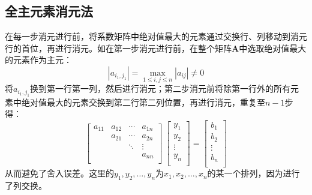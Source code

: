 \subsection{全主元素消元法}
在每一步消元进行前，将系数矩阵中绝对值最大的元素通过交换行、列移动到消元行的首位，再进行消元。如在第一步消元进行前，在整个矩阵$\boldsymbol{A}$中选取绝对值最大的元素作为主元：
\begin{equation*}
    \left| a_{i_1,j_1} \right| = \max\limits_{1\leqslant i,j\leqslant n} \left| a_{ij} \right| \neq 0
\end{equation*}
将$a_{i_1,j_1}$换到第一行第一列，然后进行消元；第二步消元前将除第一行外的所有元素中绝对值最大的元素交换到第二行第二列位置，再进行消元，重复至$n-1$步得：
\begin{equation*}
    \begin{bmatrix}
        a_{11} & a_{12} & \cdots & a_{1n} \\
        \      & a_{21} & \cdots & a_{2n} \\
        \      & \      & \ddots & \vdots \\
        \      & \      & \      & a_{nn} \\
    \end{bmatrix}\ 
    \begin{bmatrix}
        y_1 \\ y_2 \\ \vdots \\ y_n \\
    \end{bmatrix} = 
    \begin{bmatrix}
        b_1 \\ b_2 \\ \vdots \\ b_n \\
    \end{bmatrix}
\end{equation*}
从而避免了舍入误差。这里的$y_1,y_2,\dots,y_n$为$x_1,x_2,\dots,x_n$的某一个排列，因为进行了列交换。

